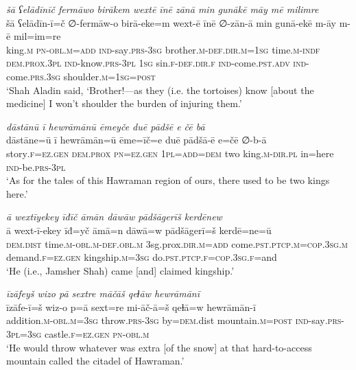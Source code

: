 \ea \label{DG.67}
\textit{šā ʕelādīnīč fermāwo birākem wextē īnē zānā min gunākē māy mē milimre} \\ 
\gll šā ʕelādīn-ī=č ∅-fermāw-o birā-eke=m wext-ē īnē ∅-zān-ā min gunā-ekē m-āy m-ē mil=im=re \\ 
 king\textsc{.m} \textsc{pn}\textsc{-obl}\textsc{.m}\textsc{=add} \textsc{ind-}say\textsc{.prs}\textsc{-3sg} brother\textsc{.m}\textsc{-def}\textsc{.dir}\textsc{.m}\textsc{=1sg} time\textsc{.m}\textsc{-indf} \textsc{dem.prox}\textsc{.3pl} \textsc{ind-}know\textsc{.prs}\textsc{-3pl} \textsc{1sg} sin\textsc{\textsc{.f}}\textsc{-def}\textsc{.dir}\textsc{\textsc{.f}} \textsc{ind-}come\textsc{.pst}\textsc{.adv} \textsc{ind-}come\textsc{.prs}\textsc{.3sg} shoulder\textsc{.m}\textsc{=1sg}\textsc{=\textsc{post}} \\ 
\glt `Shah Aladin said, ‘Brother!—as they (i.e. the tortoises) know [about the medicine] I won’t shoulder the burden of injuring them.'
\z 
 
\ea \label{DP.1}
\textit{dāstānū ī hewrāmānū ēmeyče duē pādšē e čē bā} \\ 
\gll dāstāne=ū ī hewrāmān=ū ēme=īč=e duē pādšā-ē e=čē ∅-b-ā \\ 
 story\textsc{\textsc{.f}}\textsc{=ez}\textsc{.gen} \textsc{dem.prox} \textsc{pn}\textsc{=ez}\textsc{.gen} \textsc{1pl}\textsc{=add}\textsc{=dem} two king\textsc{.m}\textsc{-dir}\textsc{.pl} in=here \textsc{ind-}be\textsc{.prs}\textsc{-3pl} \\ 
\glt `As for the tales of this Hawraman region of ours, there used to be two kings here.'
\z 
 
\ea \label{DP.17}
\textit{ā wextīyekey īđīč āmān dāwāw pādšāgerīš kerdēnew} \\ 
\gll ā wext-ī-ekey īđ=yč āmā=n dāwā=w pādšāgerī=š kerdē=ne=ū \\ 
 \textsc{dem.dist} time\textsc{.m}\textsc{-obl}\textsc{.m}\textsc{-def}\textsc{.obl}\textsc{.m} 3sg.prox\textsc{.dir}\textsc{.m}\textsc{=add} come\textsc{.pst}\textsc{.ptcp}\textsc{.m}\textsc{=cop}\textsc{.3sg}\textsc{.m} demand\textsc{\textsc{.f}}\textsc{=ez}\textsc{.gen} kingship\textsc{.m}\textsc{=3sg} do\textsc{.pst}\textsc{.ptcp}\textsc{\textsc{.f}}\textsc{=cop}\textsc{.3sg}\textsc{\textsc{.f}}=and \\ 
\glt `He (i.e., Jamsher Shah) came [and] claimed kingship.'
\z 
 
\ea \label{DP.35}
\textit{īzāfeyš wizo pā sextre māčāš qeɫāw hewrāmānī} \\ 
\gll īzāfe-ī=š wiz-o p=ā sext=re mi-āč-ā=š qeɫā=w hewrāmān-ī \\ 
 addition\textsc{.m}\textsc{-obl}\textsc{.m}\textsc{=3sg} throw\textsc{.prs}\textsc{-3sg} by\textsc{=dem}.dist mountain\textsc{.m}\textsc{=\textsc{post}} \textsc{ind-}say\textsc{.prs}\textsc{-3pl}\textsc{=3sg} castle\textsc{\textsc{.f}}\textsc{=ez}\textsc{.gen} \textsc{pn}\textsc{-obl}\textsc{.m} \\ 
\glt `He would throw whatever was extra [of the snow] at that hard-to-access mountain called the citadel of Hawraman.'
\z 
 
